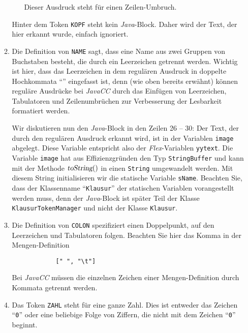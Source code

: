 \begin{enumerate}
\begin{enumerate}
\begin{enumerate}
                  Dieser Ausdruck steht f\"ur einen Zeilen-Umbruch.
            \end{enumerate}
            Hinter dem Token \texttt{KOPF} steht kein \textsl{Java}-Block.  Daher
            wird der Text, der hier erkannt wurde, einfach ignoriert.  
      \item Die Definition von \texttt{NAME} sagt, dass eine Name aus zwei Gruppen
            von Buchstaben besteht, die durch ein Leerzeichen getrennt werden.
            Wichtig ist hier, dass das Leerzeichen in dem regul\"aren Ausdruck in
            doppelte Hochkommata ``\texttt{}'' eingefasst ist, denn (wie oben
            bereits erw\"ahnt) k\"onnen regul\"are Ausdr\"ucke bei \textsl{JavaCC}\/ durch das
            Einf\"ugen von Leerzeichen, Tabulatoren und Zeilenumbr\"uchen zur Verbesserung
            der Lesbarkeit formatiert werden.

            Wir diskutieren nun den \textsl{Java}-Block in den Zeilen 26 -- 30:
            Der Text, der durch den regul\"aren Ausdruck erkannt wird, ist in der Variablen
            \texttt{image} abgelegt.  Diese Variable entspricht also der \textsl{Flex}-Variablen 
            \texttt{yytext}.  Die Variable \texttt{image} hat aus Effizienzgr\"unden den Typ
            \texttt{StringBuffer} und kann mit der Methode $\textsl{toString}()$ in einen
            \texttt{String} umgewandelt werden.  Mit diesem String initialisieren wir die 
            statische Variable \texttt{sName}.  Beachten Sie, dass der Klassenname
            ``\texttt{Klausur}'' der statischen Variablen vorangestellt werden muss,
            denn der \textsl{Java}-Block  ist sp\"ater Teil der Klasse
            \texttt{KlausurTokenManager} und nicht der Klasse \texttt{Klausur}.
            
            
      \item Die Definition von \texttt{COLON} spezifiziert einen Doppelpunkt, auf 
            den Leerzeichen und Tabulatoren folgen.  Beachten Sie hier das Komma
            in der Mengen-Definition
            \begin{verbatim}
            [" ", "\t"]
            \end{verbatim}
            \vspace*{-0.5cm}

            Bei \textsl{JavaCC}\/ m\"ussen die einzelnen Zeichen einer Mengen-Definition
            durch Kommata getrennt werden.
      \item Das Token \texttt{ZAHL} steht f\"ur eine ganze Zahl.
            Dies ist entweder das Zeichen ``\texttt{0}'' oder eine beliebige Folge von
            Ziffern, die nicht mit dem Zeichen ``\texttt{0}'' beginnt.
            

\end{enumerate}
\end{enumerate}
